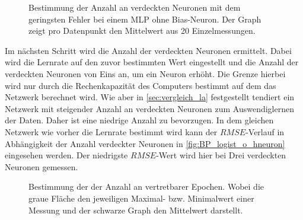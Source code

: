 \begin{figure}[!htb]
    \centering
        
    \caption{Bestimmung der Anzahl an verdeckten Neuronen mit dem geringsten Fehler bei einem MLP ohne Bias-Neuron. Der Graph zeigt pro Datenpunkt den Mittelwert aus 20 Einzelmessungen.}
    \label{fig:BP_logist_o_hneuron}
\end{figure}

Im nächsten Schritt wird die Anzahl der verdeckten Neuronen ermittelt. Dabei wird die Lernrate auf den zuvor bestimmten Wert eingestellt und die Anzahl der verdeckten Neuronen von Eins an, um ein Neuron erhöht. Die Grenze hierbei wird nur durch die Rechenkapazität des Computers bestimmt auf dem das Netzwerk berechnet wird. Wie aber in \autoref{sec:vergleich_la} festgestellt tendiert ein Netzwerk mit steigender Anzahl an verdeckten Neuronen zum Auswendiglernen der Daten. Daher ist eine niedrige Anzahl zu bevorzugen. In dem gleichen Netzwerk wie vorher die Lernrate bestimmt wird kann der $RMSE$-Verlauf in Abhängigkeit der Anzahl verdeckter Neuronen in \autoref{fig:BP_logist_o_hneuron} eingesehen werden. Der niedrigste $RMSE$-Wert wird hier bei Drei verdeckten Neuronen gemessen.\\ 

\begin{figure}[!htb]
    \centering
        
    \caption{Bestimmung der der Anzahl an vertretbarer Epochen. Wobei die graue Fläche den jeweiligen Maximal- bzw. Minimalwert einer Messung und der schwarze Graph den Mittelwert darstellt.}
    \label{fig:BP_logis_o_epochen}
\end{figure}

